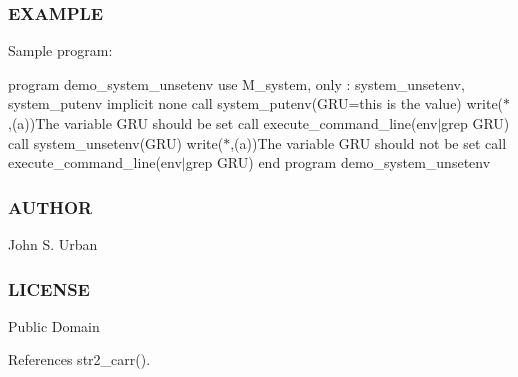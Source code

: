 \subsubsection*{E\+X\+A\+M\+P\+LE}

Sample program\+:

program demo\+\_\+system\+\_\+unsetenv use M\+\_\+system, only \+: system\+\_\+unsetenv, system\+\_\+putenv implicit none call system\+\_\+putenv(\textquotesingle{}G\+RU=this is the value\textquotesingle{}) write($\ast$,\textquotesingle{}(a)\textquotesingle{})\textquotesingle{}The variable G\+RU should be set\textquotesingle{} call execute\+\_\+command\+\_\+line(\textquotesingle{}env$\vert$grep G\+RU\textquotesingle{}) call system\+\_\+unsetenv(\textquotesingle{}G\+RU\textquotesingle{}) write($\ast$,\textquotesingle{}(a)\textquotesingle{})\textquotesingle{}The variable G\+RU should not be set\textquotesingle{} call execute\+\_\+command\+\_\+line(\textquotesingle{}env$\vert$grep G\+RU\textquotesingle{}) end program demo\+\_\+system\+\_\+unsetenv

\subsubsection*{A\+U\+T\+H\+OR}

John S. Urban \subsubsection*{L\+I\+C\+E\+N\+SE}

Public Domain 

References str2\+\_\+carr().

